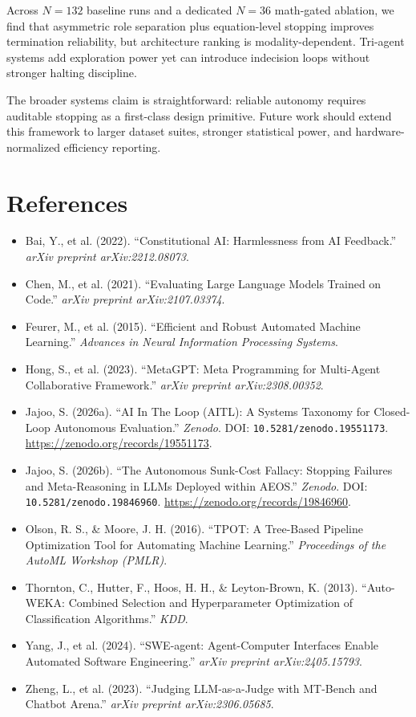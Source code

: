 \documentclass[11pt,a4paper]{article}
\begin{document}
Across $N=132$ baseline runs and a dedicated $N=36$ math-gated ablation, we find that asymmetric role separation plus equation-level stopping improves termination reliability, but architecture ranking is modality-dependent. Tri-agent systems add exploration power yet can introduce indecision loops without stronger halting discipline.

The broader systems claim is straightforward: reliable autonomy requires auditable stopping as a first-class design primitive. Future work should extend this framework to larger dataset suites, stronger statistical power, and hardware-normalized efficiency reporting.

\section{References}
\begin{itemize}
    \item Bai, Y., et al. (2022). ``Constitutional AI: Harmlessness from AI Feedback.'' \textit{arXiv preprint arXiv:2212.08073}.
    \item Chen, M., et al. (2021). ``Evaluating Large Language Models Trained on Code.'' \textit{arXiv preprint arXiv:2107.03374}.
    \item Feurer, M., et al. (2015). ``Efficient and Robust Automated Machine Learning.'' \textit{Advances in Neural Information Processing Systems}.
    \item Hong, S., et al. (2023). ``MetaGPT: Meta Programming for Multi-Agent Collaborative Framework.'' \textit{arXiv preprint arXiv:2308.00352}.
    \item Jajoo, S. (2026a). ``AI In The Loop (AITL): A Systems Taxonomy for Closed-Loop Autonomous Evaluation.'' \textit{Zenodo}. DOI: \texttt{10.5281/zenodo.19551173}. \url{https://zenodo.org/records/19551173}.
    \item Jajoo, S. (2026b). ``The Autonomous Sunk-Cost Fallacy: Stopping Failures and Meta-Reasoning in LLMs Deployed within AEOS.'' \textit{Zenodo}. DOI: \texttt{10.5281/zenodo.19846960}. \url{https://zenodo.org/records/19846960}.
    \item Olson, R. S., \& Moore, J. H. (2016). ``TPOT: A Tree-Based Pipeline Optimization Tool for Automating Machine Learning.'' \textit{Proceedings of the AutoML Workshop (PMLR)}.
    \item Thornton, C., Hutter, F., Hoos, H. H., \& Leyton-Brown, K. (2013). ``Auto-WEKA: Combined Selection and Hyperparameter Optimization of Classification Algorithms.'' \textit{KDD}.
    \item Yang, J., et al. (2024). ``SWE-agent: Agent-Computer Interfaces Enable Automated Software Engineering.'' \textit{arXiv preprint arXiv:2405.15793}.
    \item Zheng, L., et al. (2023). ``Judging LLM-as-a-Judge with MT-Bench and Chatbot Arena.'' \textit{arXiv preprint arXiv:2306.05685}.
\end{itemize}
\end{document}
